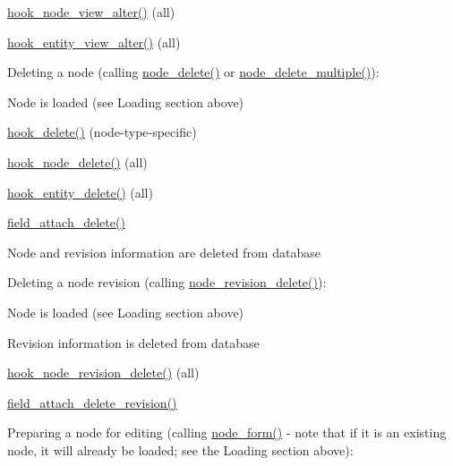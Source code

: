\begin{DoxyItemize}
\begin{DoxyItemize}
\item \hyperlink{group__node__api__hooks_gad5ece824736be57bf0020af900398b94}{hook\_\-node\_\-view\_\-alter()} (all)
\item \hyperlink{group__hooks_ga2c2be6c70815b426f0eb13b0b68edb40}{hook\_\-entity\_\-view\_\-alter()} (all)
\end{DoxyItemize}
\item Deleting a node (calling \hyperlink{node_8module_a707438913046b4959fa531386beb8024}{node\_\-delete()} or \hyperlink{node_8module_ab7b4bed8dc18cfa2d8e1839b0429effa}{node\_\-delete\_\-multiple()}):
\begin{DoxyItemize}
\item Node is loaded (see Loading section above)
\item \hyperlink{group__node__api__hooks_ga8588d8a814e8aef059d9e0f842904b35}{hook\_\-delete()} (node-\/type-\/specific)
\item \hyperlink{group__node__api__hooks_ga66ea0473a9950dc961802e801e5042e9}{hook\_\-node\_\-delete()} (all)
\item \hyperlink{group__hooks_gac329b7f9d18e7fbccb6057e6f4bc4cb9}{hook\_\-entity\_\-delete()} (all)
\item \hyperlink{group__field__attach_gac2e3658c9c02d0d0e71359f9ef2f207a}{field\_\-attach\_\-delete()}
\item Node and revision information are deleted from database
\end{DoxyItemize}
\item Deleting a node revision (calling \hyperlink{node_8module_a0f00bdfa980e632ef1346027b9064b37}{node\_\-revision\_\-delete()}):
\begin{DoxyItemize}
\item Node is loaded (see Loading section above)
\item Revision information is deleted from database
\item \hyperlink{group__node__api__hooks_gad7e8c6941181366016058771ae841bc9}{hook\_\-node\_\-revision\_\-delete()} (all)
\item \hyperlink{group__field__attach_gaa9eae65e6d9f1996cb27a55ba25b56e9}{field\_\-attach\_\-delete\_\-revision()}
\end{DoxyItemize}
\item Preparing a node for editing (calling \hyperlink{group__forms_ga267299500e205db099ee4e8396769d3f}{node\_\-form()} -\/ note that if it is an existing node, it will already be loaded; see the Loading section above):
\begin{DoxyItemize}

\end{DoxyItemize}
\end{DoxyItemize}
